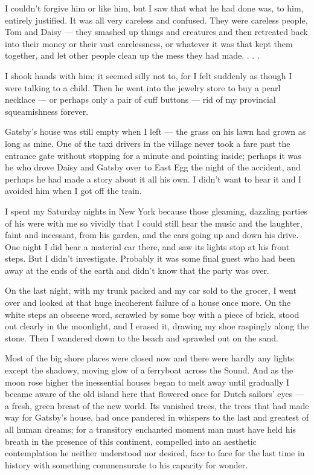 \documentclass{znotebook}
\begin{document}
I couldn't forgive him or like him, but I saw that what he had done was, to him, entirely justified. It was all very careless and confused. They were careless people, Tom and Daisy — they smashed up things and creatures and then retreated back into their money or their vast carelessness, or whatever it was that kept them together, and let other people clean up the mess they had made. . . .

I shook hands with him; it seemed silly not to, for I felt suddenly as though I were talking to a child. Then he went into the jewelry store to buy a pearl necklace — or perhaps only a pair of cuff buttons — rid of my provincial squeamishness forever.

Gatsby's house was still empty when I left — the grass on his lawn had grown as long as mine. One of the taxi drivers in the village never took a fare past the entrance gate without stopping for a minute and pointing inside; perhaps it was he who drove Daisy and Gatsby over to East Egg the night of the accident, and perhaps he had made a story about it all his own. I didn't want to hear it and I avoided him when I got off the train.

I spent my Saturday nights in New York because those gleaming, dazzling parties of his were with me so vividly that I could still hear the music and the laughter, faint and incessant, from his garden, and the cars going up and down his drive. One night I did hear a material car there, and saw its lights stop at his front steps. But I didn't investigate. Probably it was some final guest who had been away at the ends of the earth and didn't know that the party was over.

On the last night, with my trunk packed and my car sold to the grocer, I went over and looked at that huge incoherent failure of a house once more. On the white steps an obscene word, scrawled by some boy with a piece of brick, stood out clearly in the moonlight, and I erased it, drawing my shoe raspingly along the stone. Then I wandered down to the beach and sprawled out on the sand.

Most of the big shore places were closed now and there were hardly any lights except the shadowy, moving glow of a ferryboat across the Sound. And as the moon rose higher the inessential houses began to melt away until gradually I became aware of the old island here that flowered once for Dutch sailors' eyes — a fresh, green breast of the new world. Its vanished trees, the trees that had made way for Gatsby's house, had once pandered in whispers to the last and greatest of all human dreams; for a transitory enchanted moment man must have held his breath in the presence of this continent, compelled into an aesthetic contemplation he neither understood nor desired, face to face for the last time in history with something commensurate to his capacity for wonder.
\end{document}

